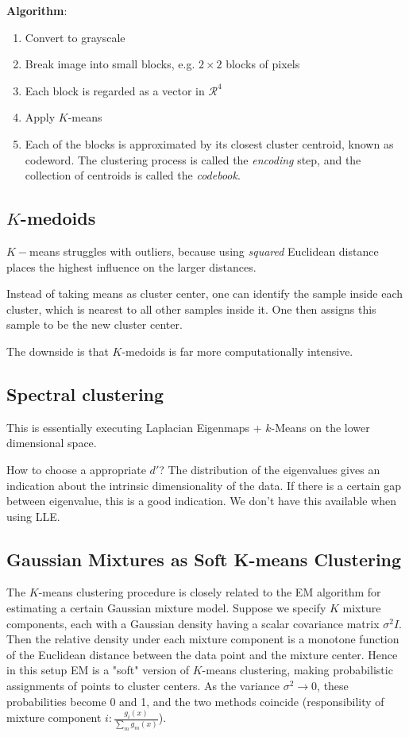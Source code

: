 \textbf{Algorithm}:
\begin{enumerate}
    \item Convert to grayscale
    \item Break image into small blocks, e.g. \(2 \times 2\) blocks of pixels
    \item Each block is regarded as a vector in \(\mathcal{R}^4\)
    \item Apply \(K\)-means
    \item Each of the blocks is approximated by its closest cluster centroid, known as codeword. The clustering process is called the \textit{encoding} step, and the collection of centroids is called the \textit{codebook}.
\end{enumerate}

\subsection*{\(K\)-medoids}
 \(K-\)means struggles with outliers, because using \textit{squared} Euclidean distance places the highest influence on the larger distances.

 Instead of taking means as cluster center, one can identify the sample inside each cluster, which is nearest to all other samples inside it. One then assigns this sample to be the new cluster center.

 The downside is that \(K\)-medoids is far more computationally intensive.

\subsection*{Spectral clustering}
This is essentially executing Laplacian Eigenmaps + \(k\)-Means on the lower dimensional space.

How to choose a appropriate \(d'\)? The distribution of the eigenvalues gives an indication about the intrinsic dimensionality of the data. If there is a certain gap between eigenvalue, this is a good indication. We don't have this available when using LLE.

\subsection*{Gaussian Mixtures as Soft K-means Clustering}
The \(K\)-means clustering procedure is closely related to the EM algorithm for estimating a certain Gaussian mixture model. Suppose we specify \(K\) mixture components, each with a Gaussian density having a scalar covariance matrix \(\sigma^2 I\). Then the relative density under each mixture component is a monotone function of the Euclidean distance between the data point and the mixture center. Hence in this setup EM is a "soft" version of \(K\)-means clustering, making probabilistic assignments of points to cluster centers. As the variance \(\sigma^2 \rightarrow 0\), these probabilities become 0 and 1, and the two methods coincide (responsibility of mixture component \(i: \frac{g_i(x)}{\sum_m g_m(x)}\)).

